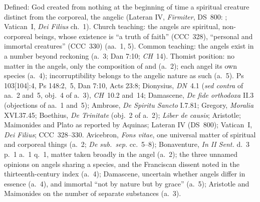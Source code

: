  {Defined: God created from nothing at the beginning of time a spiritual
 creature distinct from the corporeal, the angelic (Lateran IV,
 \emph{Firmiter}, DS~800: ; Vatican~I,
 \emph{Dei Filius} ch.~1). Church teaching: the angels are spiritual,
 non-corporeal beings, whose existence is ``a truth of faith'' (CCC~328),
 ``personal and immortal creatures'' (CCC~330) (aa.~1, 5). Common
 teaching: the angels exist in a number beyond reckoning (a.~3; Dan 7:10;
 \emph{CH}~14). Thomist position: no matter in the angels, only the
 composition of  and  (a.~2); each angel its
 own species (a.~4); incorruptibility belongs to the angelic nature as
 such (a.~5).}
 {Ps 103[104]:4, Ps 148:2,~5, Dan 7:10, Acts 23:8; Dionysius, \emph{DN}~4.1 (\emph{sed contra} of aa.~2 and~5, obj.~4 of a.~3), \emph{CH}~10.2
 and~14; Damascene, \emph{De fide orthodoxa} II.3 (objections of aa.~1
 and~5); Ambrose, \emph{De Spiritu Sancto} I.7.81; Gregory, \emph{Moralia}
 XVI.37.45; Boethius, \emph{De Trinitate} (obj.~2 of a.~2); \emph{Liber de causis}; Aristotle; Maimonides and Plato as
 reported by Aquinas; Lateran IV (DS~800); Vatican~I, \emph{Dei Filius};
 CCC~328--330.}
 {Avicebron, \emph{Fons vitae}, one universal matter of spiritual and
 corporeal things (a.~2; \emph{De sub.\ sep.} cc.~5--8); Bonaventure,
 \emph{In II Sent.} d.~3 p.~1 a.~1 q.~1, matter taken broadly in the angel
 (a.~2); the three unnamed opinions on angels sharing a species, and the
 Franciscan dissent noted in the thirteenth-century index (a.~4);
 Damascene, uncertain whether angels differ in essence (a.~4), and
 immortal ``not by nature but by grace'' (a.~5); Aristotle and Maimonides
 on the number of separate substances (a.~3).}
